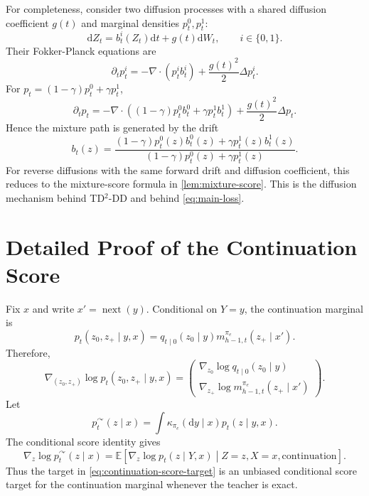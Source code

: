 \documentclass[11pt]{article}
\theoremstyle{definition}
\theoremstyle{remark}
\newcommand{\E}{\mathbb E}
\newcommand{\nextx}{\operatorname{next}}
\newcommand{\dd}{\mathrm d}
\newcommand{\targetpi}{\pi_e}
\newcommand{\branchcont}{\curvearrowright}
\begin{document}
For completeness, consider two diffusion processes with a shared diffusion
coefficient $g(t)$ and marginal densities $p_t^0,p_t^1$:
\begin{equation}
\dd Z_t=b_t^i(Z_t)\dd t+g(t)\dd W_t,
\qquad i\in\{0,1\}.
\end{equation}
Their Fokker-Planck equations are
\begin{equation}
\partial_t p_t^i
=-\nabla\cdot(p_t^i b_t^i)
+\frac{g(t)^2}{2}\Delta p_t^i.
\end{equation}
For $p_t=(1-\gamma)p_t^0+\gamma p_t^1$,
\begin{equation}
\partial_t p_t
=-\nabla\cdot
\left(
(1-\gamma)p_t^0b_t^0
+\gamma p_t^1b_t^1
\right)
+\frac{g(t)^2}{2}\Delta p_t.
\end{equation}
Hence the mixture path is generated by the drift
\begin{equation}
b_t(z)
=
\frac{
(1-\gamma)p_t^0(z)b_t^0(z)
+\gamma p_t^1(z)b_t^1(z)
}{
(1-\gamma)p_t^0(z)+\gamma p_t^1(z)
}.
\end{equation}
For reverse diffusions with the same forward drift and diffusion coefficient,
this reduces to the mixture-score formula in \cref{lem:mixture-score}. This is
the diffusion mechanism behind TD$^2$-DD and behind
\cref{eq:main-loss}.

\section{Detailed Proof of the Continuation Score}
\label{app:continuation-score}

Fix $x$ and write $x'=\nextx(y)$. Conditional on $Y=y$, the continuation
marginal is
\begin{equation}
p_t(z_0,z_+\mid y,x)
=
q_{t\mid0}(z_0\mid y)
 m_{h-1,t}^{\targetpi}(z_+\mid x').
\end{equation}
Therefore,
\begin{equation}
\nabla_{(z_0,z_+)}\log p_t(z_0,z_+\mid y,x)
=
\begin{pmatrix}
\nabla_{z_0}\log q_{t\mid0}(z_0\mid y)
\\
\nabla_{z_+}\log m_{h-1,t}^{\targetpi}(z_+\mid x')
\end{pmatrix}.
\end{equation}
Let
\begin{equation}
p_t^{\branchcont}(z\mid x)
=
\int\kappa_{\targetpi}(\dd y\mid x)
p_t(z\mid y,x).
\end{equation}
The conditional score identity gives
\begin{equation}
\nabla_z\log p_t^{\branchcont}(z\mid x)
=
\E
\left[
\nabla_z\log p_t(z\mid Y,x)
\middle|
Z=z,X=x,\text{continuation}
\right].
\end{equation}
Thus the target in \cref{eq:continuation-score-target} is an unbiased
conditional score target for the continuation marginal whenever the teacher is
exact.
\end{document}
